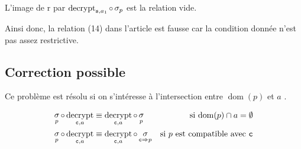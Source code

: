 \documentclass[french]{article}
\DeclareMathOperator{\sel}{\sigma}
\DeclareMathOperator{\decrypt}{decrypt}
\DeclareMathOperator{\dom}{dom}
\newcommand\typeT[1]{\text{\ttfamily #1}}
\newcommand{\decryptArgs}[2]{\decrypt_{\typeT{#1}, #2}}
\newcommand{\selP}{\sel_p}
\newcommand{\decryptCAlpha}{\decryptArgs{c}{a}}
\begin{document}
L'image de r par
$\decryptArgs{s}{a_1} \circ \sel_p$
est la relation vide.

Ainsi donc, la relation (14)
dans l'article est fausse
car la condition donnée n'est pas assez restrictive.

\subsection*{Correction possible}
Ce problème est résolu si on s'intéresse à l'intersection entre $\dom(p)$
et $a$ .

\begin{align*}
\selP \circ \decryptCAlpha 
& \equiv \decryptCAlpha \circ \selP
& \text{si $\dom(p) \cap a = \emptyset$} \\
\selP \circ \decryptCAlpha 
& \equiv \decryptCAlpha \circ \sel_{\typeT{c} \Rightarrow p}
& \text{si $p$  est compatible avec $\typeT{c}$} 
\end{align*}
\end{document}
